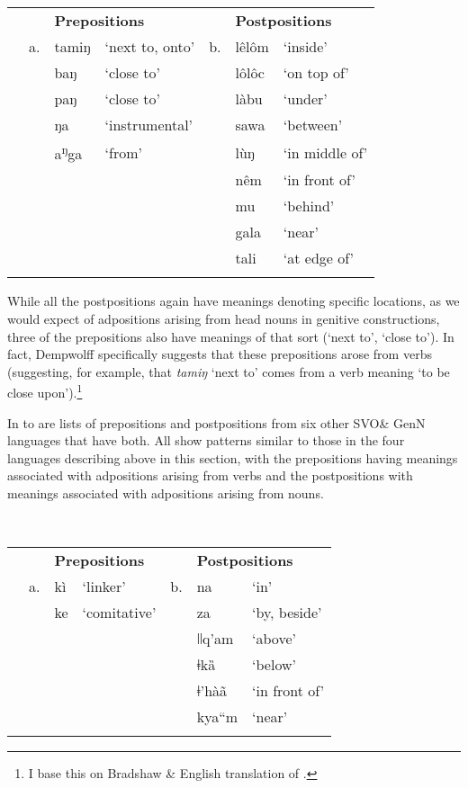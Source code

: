 \documentclass[output=paper]{langsci/langscibook}
\begin{document}
\begin{table}
\begin{tabularx}{\textwidth}{XXXXXXX} &  & \multicolumn{2}{X}{\bfseries Prepositions} &  & \multicolumn{2}{X}{\bfseries Postpositions}\\
\lsptoprule
& a. & tamiŋ & ‘next to, onto’ & b. & lêlôm & ‘inside’\\
&  & baŋ & ‘close to’ &  & lôlôc & ‘on top of’\\
&  & paŋ & ‘close to’ &  & làbu & ‘under’\\
&  & ŋa & ‘instrumental’ &  & sawa & ‘between’\\
&  & a\textsuperscript{ŋ}ga & ‘from’ &  & lùŋ & ‘in middle of’\\
&  &  &  &  & nêm & ‘in front of’\\
&  &  &  &  & mu & ‘behind’\\
&  &  &  &  & gala & ‘near’\\
&  &  &  &  & tali & ‘at edge of’\\
\lspbottomrule
\end{tabularx}
\end{table}

While all the postpositions again have meanings denoting specific locations, as we would expect of adpositions arising from head nouns in genitive constructions, three of the prepositions also have meanings of that sort (‘next to’, ‘close to’). In fact, Dempwolff specifically suggests that these prepositions arose from verbs (suggesting, for example, that \textit{tamiŋ} ‘next to’ comes from a verb meaning ‘to be close upon’).\footnote{I base this on Bradshaw \&  English translation of \citet{Dempwolff1939}.}

In  to  are lists of prepositions and postpositions from six other SVO\& GenN languages that have both. All show patterns similar to those in the four languages describing above in this section, with the prepositions having meanings associated with adpositions arising from verbs and the postpositions with meanings associated with adpositions arising from nouns.

\begin{table}
\\
\begin{tabularx}{\textwidth}{XXXXXXX}
\lsptoprule
&  & \multicolumn{2}{X}{\bfseries Prepositions} &  & \multicolumn{2}{X}{\bfseries Postpositions}\\
& a. & kì & ‘linker’ & b. & na & ‘in’\\
&  & ke & ‘comitative’ &  & za & ‘by, beside’\\
&  &  &  &  & ǀǀq'am & ‘above’\\
&  &  &  &  & ǂkȁ & ‘below’\\
&  &  &  &  & ǂ’hàã & ‘in front of’\\
&  &  &  &  & kya“m & ‘near’\\
\lspbottomrule
\end{tabularx}
\end{table}
\end{document}

